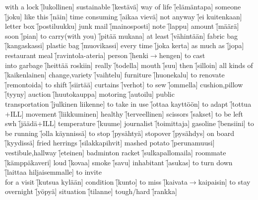 \begin{questions}
\begin{multicols}{3}
    \question with a lock \f[lukollinen]
    \question sustainable \f[kestävä]
    \question way of life \f[elämäntapa]
    \question someone \f[joku]
    \question like this \f[näin]
    \question time consuming \f[aikaa vievä]
    \question not anyway \f[ei kuitenkaan]
    \question letter box \f[postiluukku]
    \question junk mail \f[mainosposti]
    \question note \f[lappu]
    \question amount \f[määrä]
    \question soon \f[pian]
    \question to carry(with you) \f[pitää mukana]
    \question at least \f[vähintään]
    \question fabric bag \f[kangaskassi]
    \question plastic bag \f[muovikassi]
    \question every time \f[joka kerta]
    \question as much as \f[jopa]
    \question restaurant meal \f[ravintola-ateria]
    \question person \f[henki$\rightarrow$hengen]
    \question to cast\\into garbage \f[heittää roskiin]
    \question really \f[todella]
    \question mouth \f[suu]
    \question then \f[silloin]
    \question all kinds of \f[kaikenlainen]
    \question change,variety \f[vaihtelu]
    \question furniture \f[huonekalu]
    \question to renovate \f[remontoida]
    \question to shift \f[siirtää]
    \question curtains \f[verhot]
    \question to sew \f[ommella]
    \question cushion,pillow \f[tyyny]
    \question auction \f[huutokauppa]
    \question motoring \f[autoilu]
    \question public\\transportation \f[julkinen liikenne]
    \question to take in use \f[ottaa kayttöön]
    \question to adapt \f[tottua$+$ILL]
    \question movement \f[liikkuminen]
    \question healthy \f[terveellinen]
    \question scissors \f[sakset]
    \question to be left swh \f[jäädä$+$ILL]
    \question temperature \f[kuume]
    \question journalist \f[toimittaja]
    \question gasoline \f[bensiini]
    \question to be running \f[olla käynnissä]
    \question to stop \f[pysähtyä]
    \question stopover \f[pysähdys]
    \question on board \f[kyydissä]
    \question fried herrings \f[silakkapihvit]
    \question mashed potato \f[perunamuusi]
    \question vestibule,hallway \f[eteinen]
    \question badminton racket \f[sulkapallomaila]
    \question roommate \f[kämppäkaveri]
    \question loud \f[kovaa]
    \question smoke \f[savu]
    \question inhabitant \f[asukas]
    \question to turn down \f[laittaa hiljaisemmalle]
    \question to invite\\for a visit \f[kutsua kylään]
    \question condition \f[kunto]
    \question to miss \f[kaivata$\rightarrow$kaipaisin]
    \question to stay overnight \f[yöpyä]
    \question situation \f[tilanne]
    \question tough/hard \f[rankka]

\end{multicols}
\end{questions}
